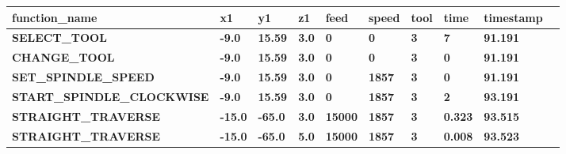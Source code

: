 \documentclass[aspectratio=169]{beamer}
\begin{document}
{\begin{frame}[fragile]
  \vspace{3mm}

  \begin{tabular}{|l|l|l|l|l|l|l|l|l|l|}

    \hline

    \tiny{\bfseries{function\_name}} & 
    \tiny{\bfseries{x1}} & 
    \tiny{\bfseries{y1}} & 
    \tiny{\bfseries{z1}} & 
    \tiny{\bfseries{feed}} & 
    \tiny{\bfseries{speed}} & 
    \tiny{\bfseries{tool}} & 
    \tiny{\bfseries{time}} & 
    \tiny{\bfseries{timestamp}} \\
    \hline

    \tiny{\bfseries{SELECT\_TOOL}} & 
    \tiny{\bfseries{-9.0}} & 
    \tiny{\bfseries{15.59}} & 
    \tiny{\bfseries{3.0}} & 
    \tiny{\bfseries{0}} & 
    \tiny{\bfseries{0}} & 
    \tiny{\bfseries{3}} & 
    \tiny{\bfseries{7}} & 
    \tiny{\bfseries{91.191}} \\    
    \hline

    \tiny{\bfseries{CHANGE\_TOOL}} & 
    \tiny{\bfseries{-9.0}} & 
    \tiny{\bfseries{15.59}} & 
    \tiny{\bfseries{3.0}} & 
    \tiny{\bfseries{0}} & 
    \tiny{\bfseries{0}} & 
    \tiny{\bfseries{3}} & 
    \tiny{\bfseries{0}} & 
    \tiny{\bfseries{91.191}} \\
    \hline

    \tiny{\bfseries{SET\_SPINDLE\_SPEED}} & 
    \tiny{\bfseries{-9.0}} & 
    \tiny{\bfseries{15.59}} & 
    \tiny{\bfseries{3.0}} & 
    \tiny{\bfseries{0}} & 
    \tiny{\bfseries{1857}} & 
    \tiny{\bfseries{3}} & 
    \tiny{\bfseries{0}} & 
    \tiny{\bfseries{91.191}} \\
    \hline

    \tiny{\bfseries{START\_SPINDLE\_CLOCKWISE}} & 
    \tiny{\bfseries{-9.0}} & 
    \tiny{\bfseries{15.59}} & 
    \tiny{\bfseries{3.0}} & 
    \tiny{\bfseries{0}} & 
    \tiny{\bfseries{1857}} & 
    \tiny{\bfseries{3}} & 
    \tiny{\bfseries{2}} & 
    \tiny{\bfseries{93.191}} \\
    \hline    

    \tiny{\bfseries{STRAIGHT\_TRAVERSE}} & 
    \tiny{\bfseries{-15.0}} & 
    \tiny{\bfseries{-65.0}} & 
    \tiny{\bfseries{3.0}} & 
    \tiny{\bfseries{15000}} & 
    \tiny{\bfseries{1857}} & 
    \tiny{\bfseries{3}} & 
    \tiny{\bfseries{0.323}} & 
    \tiny{\bfseries{93.515}} \\
    \hline

    \tiny{\bfseries{STRAIGHT\_TRAVERSE}} & 
    \tiny{\bfseries{-15.0}} & 
    \tiny{\bfseries{-65.0}} & 
    \tiny{\bfseries{5.0}} & 
    \tiny{\bfseries{15000}} & 
    \tiny{\bfseries{1857}} & 
    \tiny{\bfseries{3}} & 
    \tiny{\bfseries{0.008}} & 
    \tiny{\bfseries{93.523}} \\
    \hline


\end{tabular}
\end{frame}}
\end{document}
